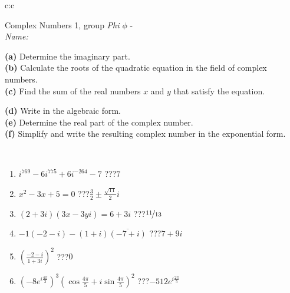 \documentclass[10pt]{report}
\begin{document}
\begin{tabular}{c:c}
\begin{minipage}[c][104.5mm][t]{0.5\linewidth}
\begin{center}
\vspace{5mm}
{\huge Complex Numbers 1, group \textit{Phi $\phi$} -}\\[5mm]
\textit{Name:}\phantom{xxxxxxxxxxxxxxxxxxxxxxxxxxxxxxxxxxxxxxxxxxxxxxxxxxxxxxxxxxxxxxxxx}\\[5mm]
\begin{minipage}{0.95\linewidth}
\begin{center}
{\small \begin{minipage}{0.44\textwidth} \raggedright
\textbf{(a)} Determine the imaginary part. \\[1mm]
\textbf{(b)} Calculate the roots of the quadratic equation in the field of complex numbers. \\[1mm]
\textbf{(c)} Find the sum of the real numbers \(x\) and \(y\) that satisfy the equation. \end{minipage} \begin{minipage}{0.54\textwidth}
\textbf{(d)} Write in the algebraic form. \\[1mm]
\textbf{(e)} Determine the real part of the complex number. \\[1mm]
\textbf{(f)} Simplify and write the resulting complex number in the exponential form.
\end{minipage}
} \vspace{3mm}
\end{center}
\end{minipage}
\\[1mm]
\begin{minipage}{0.79\linewidth}
\begin{center}
\begin{varwidth}{\linewidth}
\setlength{\itemsep}{0pt}
\begin{enumerate}
\large
\item $i^{769}-6i^{775}+6i^{-264}-7$\quad \dotfill\; ???\;\dotfill \quad $7$
\item $x^2-3x+5=0$\quad \dotfill\; ???\;\dotfill \quad $\frac{3}{2} \pm{}\frac{ \sqrt{11}}{2}i$
\item $(2+3i)(3x-3yi)=6+3i$\quad \dotfill\; ???\;\dotfill \quad $\nicefrac{11}{13}$
\item $-1(-2-i)-(1+i)\overline{(-7+i)}$\quad \dotfill\; ???\;\dotfill \quad $7+9i$
\item $\left(\frac{-2-i}{1+3i}\right)^2$\quad \dotfill\; ???\;\dotfill \quad $0$
\item $\left(-8e^{i\frac{4\pi}{3}}\right)^{3}\left(\cos{\frac{4\pi}{5}}+i\sin{\frac{4\pi}{5}}\right)^{2}$\quad \dotfill\; ???\;\dotfill \quad $-512e^{i\frac{2\pi}{5}}$

\end{enumerate}
\end{varwidth}
\end{center}
\end{minipage}
\end{center}
\end{minipage}
\end{tabular}
\end{document}
